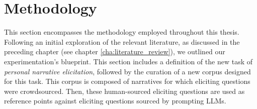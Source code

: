 \chapter{Methodology}
\label{cha:methodology}
This section encompasses the methodology employed throughout this thesis. Following an initial exploration of the relevant literature, as discussed in the preceding chapter (see chapter \ref{cha:literature_review}), we outlined our experimentation's blueprint. %
This section includes a definition of the new task of \emph{personal narrative elicitation}, followed by the curation of a new corpus designed for this task. This corpus is composed of narratives for which eliciting questions were crowdsourced. Then, these human-sourced eliciting questions are used as reference points against eliciting questions sourced by prompting LLMs.

